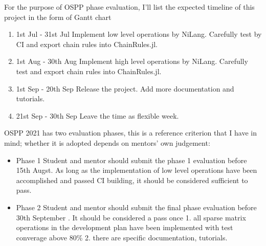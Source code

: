 For the purpose of OSPP phase evaluation, I’ll list the expected timeline of this project in the form of Gantt chart \cite{gantt1910work}
\begin{enumerate}[(1)]
    \item 1st Jul - 31st Jul \quad Implement low level operations by NiLang. Carefully test by CI and export chain rules into ChainRules.jl.
    \item 1st Aug - 30th Aug   \quad Implement high level operations by NiLang. Carefully test and export chain rules into ChainRules.jl.
    \item 1st Sep - 20th Sep \quad Release the project. Add more documentation and tutorials.
    \item 21st Sep - 30th Sep \quad Leave the time as flexible week. 
\end{enumerate}
\vspace{0.5cm}


\vspace{0.5cm}  


OSPP 2021 has two evaluation phases, this is a reference criterion that I have in mind; whether it is adopted depends on mentors’ own judgement:

\begin{itemize}
    \item Phase 1 \quad Student and mentor should submit the phase 1 evaluation before 15th Augst. As long as the implementation of low level operations have been accomplished and passed CI building, it should be considered sufficient to pass.
    \item Phase 2 \quad Student and mentor should submit the final phase evaluation before 30th September
    . It should be considered a pass once 1. all sparse matrix operations in the development plan have been implemented with test converage above 80\% 2. there are specific documentation, tutorials.
\end{itemize}